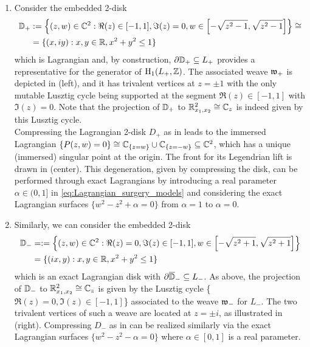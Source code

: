 \begin{enumerate}
    \item Consider the embedded 2-disk
    \begin{equation}\label{eq:compressing_disk_MorsificationA1_plus}
    \begin{split}
    \mathbb{D}_+&:=\left\{(z,w)\in\mathbb{C}^2: \Re(z)\in[-1,1],\Im(z)=0, w\in\left[-\sqrt{z^2-1},\sqrt{z^2-1}\right]\right\}\cong\\
        &=\{(x,iy):x,y\in\mathbb{R},x^2+y^2\leq 1\}
        \end{split}
    \end{equation}
    which is Lagrangian and, by construction, $\partial\mathbb{D}_+\subseteq L_+$ provides a representative for the generator of $\operatorname{H}_1(L_+,\mathbb{Z})$. The associated weave $\mathfrak{w}_+$ is depicted in  (left), and it has trivalent vertices at $z=\pm1$ with the only mutable Lusztig cycle being supported at the segment $\Re(z)\in[-1,1]$ with $\Im(z)=0$. Note that the projection of $\mathbb{D}_+$ to $\mathbb{R}^2_{x_1,x_2}\cong\mathbb{C}_z$ is indeed given by this Lusztig cycle.\\
    
    \noindent Compressing the Lagrangian 2-disk $D_+$ as in  leads to the immersed Lagrangian $\{P(z,w)=0\}\cong \mathbb{C}_{\{z=w\}}\cup \mathbb{C}_{\{z=-w\}}\subseteq\mathbb{C}^2$, which has a unique (immersed) singular point at the origin. The front for its Legendrian lift is drawn in  (center). This degeneration, given by compressing the disk, can be performed through exact Lagrangians by introducing a real parameter $\alpha\in(0,1]$ in \eqref{eq:Lagrangian_surgery_models} and considering the exact Lagrangian surfaces $\{w^2-z^2+\alpha=0\}$ from $\alpha=1$ to $\alpha=0$.\\

     \item Similarly, we can consider the embedded 2-disk
    \begin{equation}\label{eq:compressing_disk_MorsificationA1_plus2}
        \begin{split}
        \mathbb{D}_-&=:=\left\{(z,w)\in\mathbb{C}^2: \Re(z)=0,\Im(z)\in[-1,1], w\in\left[-\sqrt{z^2+1},\sqrt{z^2+1}\right]\right\}\\
                &=\{(ix,y):x,y\in\mathbb{R},x^2+y^2\leq 1\}
        \end{split}
    \end{equation}
    which is an exact Lagrangian disk with $\partial\overline{\mathbb{D}}_-\subseteq L_-$. As above, the projection of $\mathbb{D}_-$ to $\mathbb{R}^2_{x_1,x_2}\cong\mathbb{C}_z$ is given by the Lusztig cycle \{$\Re(z)=0,\Im(z)\in[-1,1]$\} associated to the weave $\mathfrak{w}_-$ for $L_-$. The two trivalent vertices of such a weave are located at $z=\pm i$, as illustrated in  (right). Compressing $D_-$ as in  can be realized similarly via the exact Lagrangian surfaces $\{w^2-z^2-\alpha=0\}$ where $\alpha\in[0,1]$ is a real parameter.\\
\end{enumerate}


